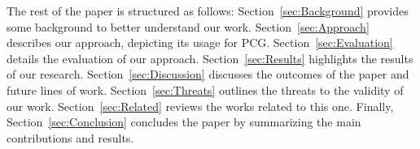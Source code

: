 The rest of the paper is structured as follows: Section~\ref{sec:Background} provides some background to better understand our work. Section~\ref{sec:Approach} describes our approach, depicting its usage for PCG. Section~\ref{sec:Evaluation} details the evaluation of our approach. Section~\ref{sec:Results} highlights the results of our research. Section~\ref{sec:Discussion} discusses the outcomes of the paper and future lines of work. Section~\ref{sec:Threats} outlines the threats to the validity of our work. Section~\ref{sec:Related} reviews the works related to this one. Finally, 
Section~\ref{sec:Conclusion} concludes the paper by summarizing the main contributions and results.